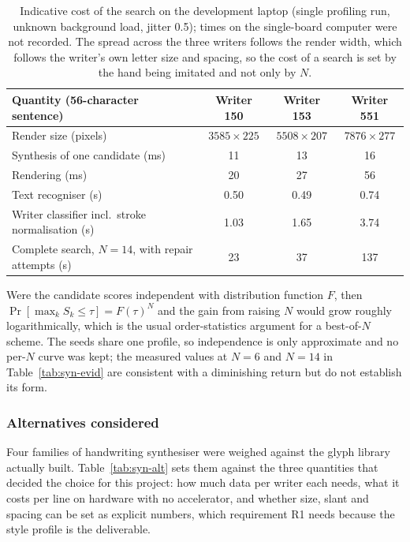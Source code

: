 \begin{table}[!htbp]
\centering
\fontsize{8}{9.6}\selectfont
\setlength{\tabcolsep}{4pt}
\begin{tabularx}{\linewidth}{|X|c|c|c|}
\hline
\textbf{Quantity (56-character sentence)} & \textbf{Writer 150} & \textbf{Writer 153} & \textbf{Writer 551} \\
\hline
Render size (pixels) & $3585\times225$ & $5508\times207$ & $7876\times277$ \\
Synthesis of one candidate (ms) & 11 & 13 & 16 \\
Rendering (ms) & 20 & 27 & 56 \\
Text recogniser (s) & 0.50 & 0.49 & 0.74 \\
Writer classifier incl.\ stroke normalisation (s) & 1.03 & 1.65 & 3.74 \\
Complete search, $N=14$, with repair attempts (s) & 23 & 37 & 137 \\
\hline
\end{tabularx}
\caption{Indicative cost of the search on the development laptop (single profiling run, unknown background load, jitter 0.5); times on the single-board computer were not recorded. The spread across the three writers follows the render width, which follows the writer's own letter size and spacing, so the cost of a search is set by the hand being imitated and not only by $N$.}
\label{tab:syn-cost}
\end{table}

Were the candidate scores independent with distribution function $F$, then $\Pr[\max_kS_k\le\tau]=F(\tau)^N$ and the gain from raising $N$ would grow roughly logarithmically, which is the usual order-statistics argument for a best-of-$N$ scheme.
The seeds share one profile, so independence is only approximate and no per-$N$ curve was kept; the measured values at $N=6$ and $N=14$ in Table~\ref{tab:syn-evid} are consistent with a diminishing return but do not establish its form.

\subsubsection{Alternatives considered}

Four families of handwriting synthesiser were weighed against the glyph library actually built. Table~\ref{tab:syn-alt} sets them against the three quantities that decided the choice for this project: how much data per writer each needs, what it costs per line on hardware with no accelerator, and whether size, slant and spacing can be set as explicit numbers, which requirement R1 needs because the style profile is the deliverable.

